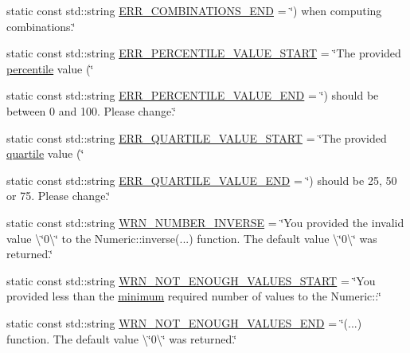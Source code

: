 \begin{DoxyCompactItemize}
static const std\-::string \hyperlink{classmultiscale_1_1Numeric_a5f24aa1c11749deac42726f349131db5}{E\-R\-R\-\_\-\-C\-O\-M\-B\-I\-N\-A\-T\-I\-O\-N\-S\-\_\-\-E\-N\-D} = \char`\"{}) when computing combinations.\char`\"{}
\item 
static const std\-::string \hyperlink{classmultiscale_1_1Numeric_a3bdb010188c74dc7570f950539df5e93}{E\-R\-R\-\_\-\-P\-E\-R\-C\-E\-N\-T\-I\-L\-E\-\_\-\-V\-A\-L\-U\-E\-\_\-\-S\-T\-A\-R\-T} = \char`\"{}The provided \hyperlink{classmultiscale_1_1Numeric_aff0c6b0c3d82bec3761a5e2d08394513}{percentile} value (\char`\"{}
\item 
static const std\-::string \hyperlink{classmultiscale_1_1Numeric_a0f89f3a8ecbc3709bac3f04b83819bf6}{E\-R\-R\-\_\-\-P\-E\-R\-C\-E\-N\-T\-I\-L\-E\-\_\-\-V\-A\-L\-U\-E\-\_\-\-E\-N\-D} = \char`\"{}) should be between 0 and 100. Please change.\char`\"{}
\item 
static const std\-::string \hyperlink{classmultiscale_1_1Numeric_ac76a6a6f1fa8abae2855f4fed0f0d97e}{E\-R\-R\-\_\-\-Q\-U\-A\-R\-T\-I\-L\-E\-\_\-\-V\-A\-L\-U\-E\-\_\-\-S\-T\-A\-R\-T} = \char`\"{}The provided \hyperlink{classmultiscale_1_1Numeric_a127a2b3e5e659b4e493767ba23fc45da}{quartile} value (\char`\"{}
\item 
static const std\-::string \hyperlink{classmultiscale_1_1Numeric_ac63a2d1c105ab47208d6c40827f9769c}{E\-R\-R\-\_\-\-Q\-U\-A\-R\-T\-I\-L\-E\-\_\-\-V\-A\-L\-U\-E\-\_\-\-E\-N\-D} = \char`\"{}) should be 25, 50 or 75. Please change.\char`\"{}
\item 
static const std\-::string \hyperlink{classmultiscale_1_1Numeric_ac1e4755ec54d2c04217d0d1f4b5d346b}{W\-R\-N\-\_\-\-N\-U\-M\-B\-E\-R\-\_\-\-I\-N\-V\-E\-R\-S\-E} = \char`\"{}You provided the invalid value \textbackslash{}\char`\"{}0\textbackslash{}\char`\"{} to the Numeric\-::inverse(...) function. The default value \textbackslash{}\char`\"{}0\textbackslash{}\char`\"{} was returned.\char`\"{}
\item 
static const std\-::string \hyperlink{classmultiscale_1_1Numeric_ab78e644d069f448030e24fecb7c4c8d9}{W\-R\-N\-\_\-\-N\-O\-T\-\_\-\-E\-N\-O\-U\-G\-H\-\_\-\-V\-A\-L\-U\-E\-S\-\_\-\-S\-T\-A\-R\-T} = \char`\"{}You provided less than the \hyperlink{classmultiscale_1_1Numeric_a1ba7305dcaa1d1baf17946beb233145d}{minimum} required number of values to the Numeric\-::\char`\"{}
\item 
static const std\-::string \hyperlink{classmultiscale_1_1Numeric_a735efee33b8687c010a03cb1e5e9589c}{W\-R\-N\-\_\-\-N\-O\-T\-\_\-\-E\-N\-O\-U\-G\-H\-\_\-\-V\-A\-L\-U\-E\-S\-\_\-\-E\-N\-D} = \char`\"{}(...) function. The default value \textbackslash{}\char`\"{}0\textbackslash{}\char`\"{} was returned.\char`\"{}

\end{DoxyCompactItemize}
